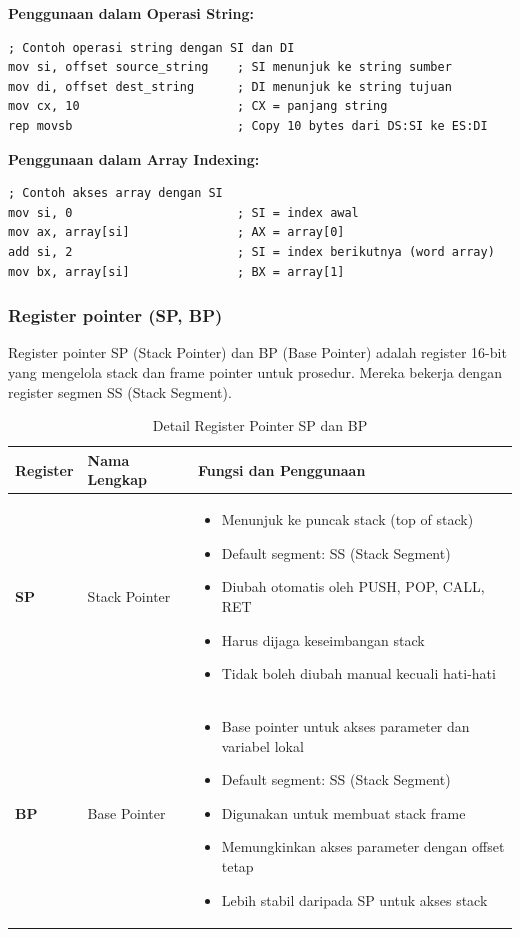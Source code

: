 \textbf{Penggunaan dalam Operasi String:}
\begin{lstlisting}[language={[x86masm]Assembler}, caption=Operasi String dengan SI dan DI, label=lst:string-operations]
; Contoh operasi string dengan SI dan DI
mov si, offset source_string    ; SI menunjuk ke string sumber
mov di, offset dest_string      ; DI menunjuk ke string tujuan
mov cx, 10                      ; CX = panjang string
rep movsb                       ; Copy 10 bytes dari DS:SI ke ES:DI
\end{lstlisting}

\textbf{Penggunaan dalam Array Indexing:}
\begin{lstlisting}[language={[x86masm]Assembler}, caption=Akses Array dengan SI, label=lst:array-indexing]
; Contoh akses array dengan SI
mov si, 0                       ; SI = index awal
mov ax, array[si]               ; AX = array[0]
add si, 2                       ; SI = index berikutnya (word array)
mov bx, array[si]               ; BX = array[1]
\end{lstlisting}

\subsubsection{Register pointer (SP, BP)}
Register pointer SP (Stack Pointer) dan BP (Base Pointer) adalah register 16-bit yang mengelola stack dan frame pointer untuk prosedur. Mereka bekerja dengan register segmen SS (Stack Segment).

\begin{table}[h]
\centering
\caption{Detail Register Pointer SP dan BP}
\begin{tabular}{|p{2cm}|p{4cm}|p{9cm}|}
\hline
\textbf{Register} & \textbf{Nama Lengkap} & \textbf{Fungsi dan Penggunaan} \\
\hline
\textbf{SP} & Stack Pointer & \begin{itemize}
\item Menunjuk ke puncak stack (top of stack)
\item Default segment: SS (Stack Segment)
\item Diubah otomatis oleh PUSH, POP, CALL, RET
\item Harus dijaga keseimbangan stack
\item Tidak boleh diubah manual kecuali hati-hati
\end{itemize} \\
\hline
\textbf{BP} & Base Pointer & \begin{itemize}
\item Base pointer untuk akses parameter dan variabel lokal
\item Default segment: SS (Stack Segment)
\item Digunakan untuk membuat stack frame
\item Memungkinkan akses parameter dengan offset tetap
\item Lebih stabil daripada SP untuk akses stack
\end{itemize} \\
\hline
\end{tabular}
\label{tab:pointer-registers-detail}
\end{table}

